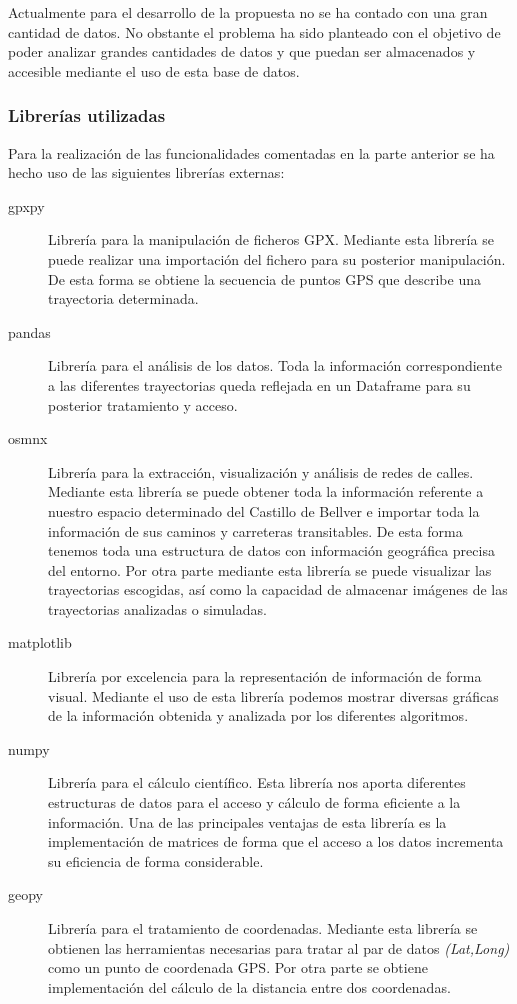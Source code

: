 Actualmente para el desarrollo de la propuesta no se ha contado con una gran cantidad de datos.
No obstante el problema ha sido planteado con el objetivo de poder analizar grandes cantidades de datos y que puedan
ser almacenados y accesible mediante el uso de esta base de datos.
\subsubsection{Librerías utilizadas}
Para la realización de las funcionalidades comentadas en la parte anterior se ha hecho uso de las siguientes librerías externas:
\begin{description}
\item[gpxpy] Librería para la manipulación de ficheros \ac{GPX}. Mediante esta librería se puede realizar una importación del fichero para su posterior manipulación. De esta forma se obtiene la secuencia de puntos \ac{GPS} que describe una trayectoria determinada.
\item[pandas] Librería para el análisis de los datos. Toda la información correspondiente a las diferentes trayectorias queda reflejada en un Dataframe para su posterior tratamiento y acceso.
\item[osmnx] Librería para la extracción, visualización y análisis de redes de calles. Mediante esta librería se puede obtener toda la información referente a nuestro espacio determinado del Castillo de Bellver e importar toda la información de sus caminos y carreteras transitables. De esta forma tenemos toda una estructura de datos con información geográfica precisa del entorno. Por otra parte mediante esta librería se puede visualizar las trayectorias escogidas, así como la capacidad de almacenar imágenes de las trayectorias analizadas o simuladas.
\item[matplotlib] Librería por excelencia para la representación de información de forma visual. Mediante el uso de esta librería podemos mostrar diversas gráficas de la información obtenida y analizada por los diferentes algoritmos.
\item[numpy] Librería para el cálculo científico. Esta librería nos aporta diferentes estructuras de datos para el acceso y cálculo de forma eficiente a la información. Una de las principales ventajas de esta librería es la implementación de matrices de forma que el acceso a los datos incrementa su eficiencia de forma considerable.
\item[geopy] Librería para el tratamiento de coordenadas. Mediante esta librería se obtienen las herramientas necesarias para tratar al par de datos \textit{(Lat,Long)} como un punto de coordenada  \ac{GPS}. Por otra parte se obtiene implementación del cálculo de la distancia entre dos coordenadas.

\end{description}

